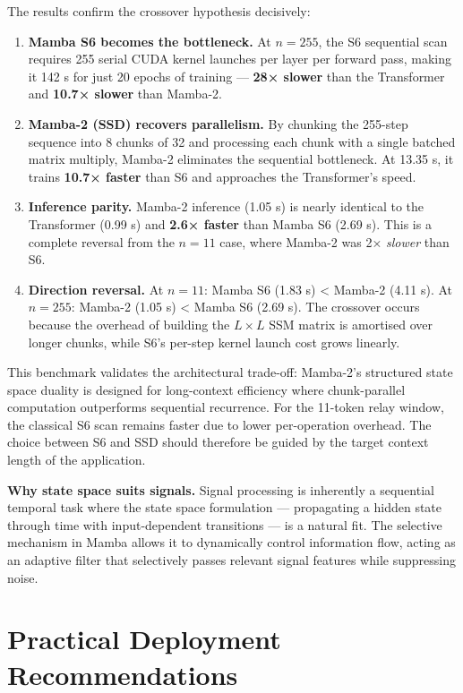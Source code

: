 The results confirm the crossover hypothesis decisively:

\begin{enumerate}
\def\labelenumi{\arabic{enumi}.}
\item
  \textbf{Mamba S6 becomes the bottleneck.} At \(n = 255\), the S6 sequential scan requires 255 serial CUDA kernel launches per layer per forward pass, making it 142 s for just 20 epochs of training --- \textbf{28× slower} than the Transformer and \textbf{10.7× slower} than Mamba-2.
\item
  \textbf{Mamba-2 (SSD) recovers parallelism.} By chunking the 255-step sequence into 8 chunks of 32 and processing each chunk with a single batched matrix multiply, Mamba-2 eliminates the sequential bottleneck. At 13.35 s, it trains \textbf{10.7× faster} than S6 and approaches the Transformer's speed.
\item
  \textbf{Inference parity.} Mamba-2 inference (1.05 s) is nearly identical to the Transformer (0.99 s) and \textbf{2.6× faster} than Mamba S6 (2.69 s). This is a complete reversal from the \(n = 11\) case, where Mamba-2 was 2× \emph{slower} than S6.
\item
  \textbf{Direction reversal.} At \(n = 11\): Mamba S6 (1.83 s) \textless{} Mamba-2 (4.11 s). At \(n = 255\): Mamba-2 (1.05 s) \textless{} Mamba S6 (2.69 s). The crossover occurs because the overhead of building the \(L \times L\) SSM matrix is amortised over longer chunks, while S6's per-step kernel launch cost grows linearly.
\end{enumerate}

This benchmark validates the architectural trade-off: Mamba-2's structured state space duality is designed for long-context efficiency where chunk-parallel computation outperforms sequential recurrence. For the 11-token relay window, the classical S6 scan remains faster due to lower per-operation overhead. The choice between S6 and SSD should therefore be guided by the target context length of the application.

\textbf{Why state space suits signals.} Signal processing is inherently a sequential temporal task where the state space formulation --- propagating a hidden state through time with input-dependent transitions --- is a natural fit. The selective mechanism in Mamba allows it to dynamically control information flow, acting as an adaptive filter that selectively passes relevant signal features while suppressing noise.

\section{Practical Deployment Recommendations}\label{sec:practical-deployment-recommendations}


